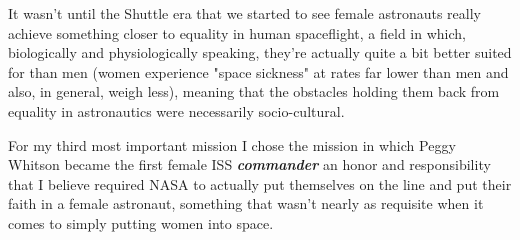 \documentclass{article}
\begin{document}
  It wasn't until the Shuttle era that we started to see female
  astronauts really achieve something closer to equality in human spaceflight,
  a field in which, biologically and physiologically speaking, they're actually
  quite a bit better suited for than men (women experience "space sickness" at
  rates far lower than men and also, in general, weigh less), meaning that the
  obstacles holding them back from equality in astronautics were necessarily
  socio-cultural.

  For my third most important mission I chose the mission in which Peggy Whitson
  became the first female ISS \textbf{\textit{commander}} an honor and responsibility that I
  believe required NASA to actually put themselves on the line and put their faith
  in a female astronaut, something that wasn't nearly as requisite when it comes 
  to simply putting women into space.
\end{document}
